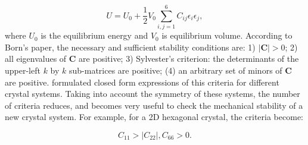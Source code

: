 \begin{equation}
U=U_0+\frac{1}{2}V_0\sum_{i,j=1}^6 C_{ij}\epsilon_i\epsilon_j,
\end{equation}
where $U_0$ is the equilibrium energy and $V_0$ is equilibrium volume. According to Born's paper\cite{born_1940}, the necessary and sufficient stability conditions are: 1) $|\mathbf{C}|>0$; 2) all eigenvalues of $\mathbf{C}$ are positive; 3) Sylvester’s criterion: the determinants of the upper-left $k$ by $k$ sub-matrices are positive; (4) an arbitrary set of minors of $\mathbf{C}$ are positive. \citet{Mouhat2014} formulated closed form expressions of this criteria for different crystal systems. Taking into account the symmetry of these systems, the number of criteria reduces, and becomes very useful to check the mechanical stability of a new crystal system. For example, for a 2D hexagonal crystal, the criteria become:

\begin{equation}
C_{11}>|C_{22}|,C_{66}>0.
\end{equation}